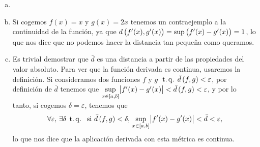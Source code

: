 \begin{eje}
  \begin{enumerate}[(a)]
   \item []
   \item Si cogemos $f(x)=x$ y $g(x)=2x$ tenemos un contraejemplo a la continuidad de la función, ya que $d\left( f'(x), g'(x) \right) = \sup \left( f'(x)-g'(x)\right) = 1$, lo que nos dice que no podemos hacer la distancia tan pequeña como queramos.
   \item Es trivial demostrar que $\bar{d}$ es una distancia a partir de las propiedades del valor absoluto.  Para ver que la función derivada es continua, usaremos la definición.
   Si consideramos dos funciones $f$ y $g$ $\operatorname{\;t.q.\;} \bar{d}\left( f,g\right) < \varepsilon$, por definición de $\bar{d}$ tenemos que $\sup\limits_{x \in [a,b]} \abs{f'(x)-g'(x)}<\bar{d}\left( f,g\right)<\varepsilon$, y por lo tanto, si cogemos $\delta = \varepsilon$, tenemos que
   \[
    \forall \varepsilon,\, \exists \delta \operatorname{\;t.q.\;} \text{ si } \bar{d}\left( f,g \right) < \delta,\, \sup_{x \in [a,b]} \abs{f'(x)-g'(x)}<\bar{d}<\varepsilon,
   \]
    lo que nos dice que la aplicación derivada con esta métrica es continua.
  \end{enumerate}
\end{eje}

